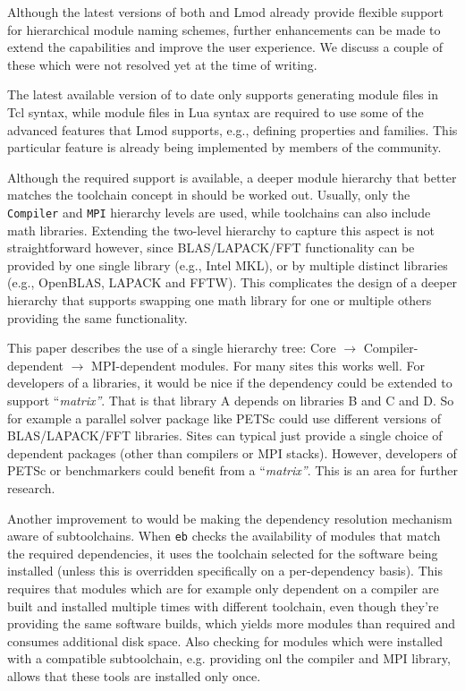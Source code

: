 Although the latest versions of both \easybuild{} and Lmod already provide
flexible support for hierarchical module naming schemes, further enhancements can
be made to extend the capabilities and improve the user experience. We discuss
a couple of these which were not resolved yet at the time of writing.

The latest available version of \easybuild{} to date only supports generating
module files in Tcl syntax, while module files in Lua syntax are required to use
some of the advanced features that Lmod supports, e.g., defining properties and
families. This particular feature is already being implemented by members of the
\easybuild{} community.

Although the required support is available, a deeper module hierarchy that
better matches the toolchain concept in \easybuild{} should be worked out.
Usually, only the \texttt{Compiler} and \texttt{MPI} hierarchy levels are used,
while \easybuild{} toolchains can also include math libraries. Extending
the two-level hierarchy to capture this aspect is not straightforward however,
since BLAS/LAPACK/FFT functionality can be provided by one single library (e.g.,
Intel MKL), or by multiple distinct libraries (e.g., OpenBLAS, LAPACK and FFTW).
This complicates the design of a deeper hierarchy that supports swapping one
math library for one or multiple others providing the same functionality.

This paper describes the use of a single hierarchy tree: Core
$\rightarrow$ Compiler-dependent $\rightarrow$ MPI-dependent modules.
For many sites this works well.  For developers of a libraries, it
would be nice if the dependency could be extended to support
``{\em matrix''\/}.  That is that library A depends on libraries B and C and
D.  So for example a parallel solver package like PETSc could use
different versions of BLAS/LAPACK/FFT libraries.  Sites can typical
just provide a single choice of dependent packages (other than
compilers or MPI stacks).  However, developers of PETSc or
benchmarkers could benefit from a ``{\em matrix''\/}.
This is an area for further research.

Another improvement to \easybuild{} would be making the dependency resolution
mechanism aware of subtoolchains. When \texttt{eb} checks the availability of
modules that match the required dependencies, it uses the toolchain selected
for the software being installed (unless this is overridden specifically on a
per-dependency basis). This requires that modules which are for example only
dependent on a compiler are built and installed multiple times with different
toolchain, even though they're providing the same software builds, which yields
more modules than required and consumes additional disk space. Also checking for
modules which were installed with a compatible subtoolchain, e.g. providing onl
the compiler and MPI library, allows that these tools are installed only once.

